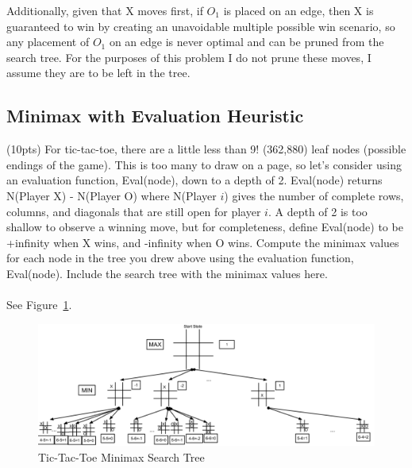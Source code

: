 \documentclass{article}
\begin{document}
Additionally, given that X moves first, if $O_1$ is placed on an edge, then X is guaranteed to win by creating an unavoidable multiple possible win scenario, so any placement of $O_1$ on an edge is never optimal and can be pruned from the search tree. For the purposes of this problem I do not prune these moves, I assume they are to be left in the tree.

\subsection{Minimax with Evaluation Heuristic} (10pts) For tic-tac-toe, there are a little less than 9! (362,880) leaf nodes (possible endings of the game). This is too many to draw on a page, so let's consider using an evaluation function, Eval(node), down to a depth of 2. Eval(node) returns N(Player X) - N(Player O) where N(Player $i$) gives the number of complete rows, columns, and diagonals that are still open for player $i$. A depth of 2 is too shallow to observe a winning move, but for completeness, define Eval(node) to be +infinity when X wins, and -infinity when O wins. Compute the minimax values for each node in the tree you drew above using the evaluation function, Eval(node). Include the search tree with the minimax values here.\\
\\
See Figure~\ref{fig:minimax_tree}.
\begin{figure}[h]
    \centering
    \includegraphics[scale=0.2]{figures/Minimax_Solved_TicTacToe_SearchTree_Template.png}
    \caption{Tic-Tac-Toe Minimax Search Tree}
    \label{fig:minimax_tree}
\end{figure}
\end{document}
